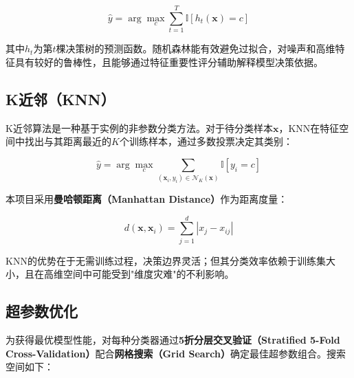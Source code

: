 \documentclass[UTF8,a4paper,12pt]{ctexart}
\numberwithin{figure}{section}
\numberwithin{table}{section}
\begin{document}
\begin{equation}
\hat{y} = \arg\max_{c} \sum_{t=1}^{T} \mathbb{I}[h_t(\mathbf{x}) = c]
\end{equation}

其中$h_t$为第$t$棵决策树的预测函数。随机森林能有效避免过拟合，对噪声和高维特征具有较好的鲁棒性，且能够通过特征重要性评分辅助解释模型决策依据。

\subsection{K近邻（KNN）}

K近邻算法是一种基于实例的非参数分类方法。对于待分类样本$\mathbf{x}$，KNN在特征空间中找出与其距离最近的$K$个训练样本，通过多数投票决定其类别：

\begin{equation}
\hat{y} = \arg\max_{c} \sum_{(\mathbf{x}_i, y_i) \in \mathcal{N}_K(\mathbf{x})} \mathbb{I}[y_i = c]
\end{equation}

本项目采用\textbf{曼哈顿距离（Manhattan Distance）}作为距离度量：

\begin{equation}
d(\mathbf{x}, \mathbf{x}_i) = \sum_{j=1}^{d} |x_j - x_{ij}|
\end{equation}

KNN的优势在于无需训练过程，决策边界灵活；但其分类效率依赖于训练集大小，且在高维空间中可能受到"维度灾难"的不利影响。

\subsection{超参数优化}

为获得最优模型性能，对每种分类器通过\textbf{5折分层交叉验证（Stratified 5-Fold Cross-Validation）}配合\textbf{网格搜索（Grid Search）}确定最佳超参数组合。搜索空间如下：
\end{document}
